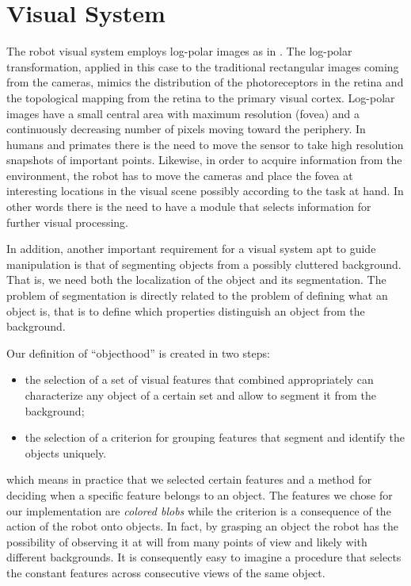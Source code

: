 \section{Visual System}
\label{sect:vision}

The robot visual system employs log-polar images as in \cite{sandini80retinalike}. The log-polar transformation, applied in this case to the traditional rectangular images coming from the cameras, mimics the distribution of the photoreceptors in the retina and the topological mapping from the retina to the primary visual cortex. Log-polar images have a small central area with maximum resolution (fovea) and a continuously decreasing number of pixels moving toward the periphery. In humans and primates there is the need to move the sensor to take high resolution snapshots of important points. Likewise, in order to acquire information from the environment, the robot has to move the cameras and place the fovea at interesting locations in the visual scene possibly according to the task at hand. In other words there is the need to have a module that selects information for further visual processing.

In addition, another important requirement for a visual system apt to guide manipulation is that of segmenting objects from a possibly cluttered background. That is, we need both the localization of the object and its segmentation. The problem of segmentation is directly related to the problem of defining what an object is, that is to define which properties distinguish an object from the background.

Our definition of ``objecthood'' is created in two steps:
\begin{itemize}
\item the selection of a set of visual features that combined appropriately can characterize any object of a certain set and allow to segment it from the background;
\item the selection of a criterion for grouping features that segment and identify the objects uniquely.
\end{itemize}
\noindent which means in practice that we selected certain features and a method for deciding when a specific feature belongs to an object. The features we chose for our implementation are {\em colored blobs} while the criterion is a consequence of the action of the robot onto objects. In fact, by grasping an object the robot has the possibility of observing it at will from many points of view and likely with different backgrounds. It is consequently easy to imagine a procedure that selects the constant features across consecutive views of the same object.

